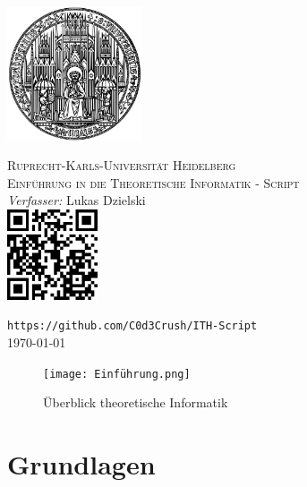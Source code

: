 \documentclass[a4paper,11pt]{article}
\begin{document}
\begin{titlepage}
    \centering
    \vspace*{2cm}
  
    \includegraphics[width=0.3\textwidth]{unilogo.png}
    \vspace{1cm}
  
    \textsc{\LARGE Ruprecht-Karls-Universität Heidelberg}\\[0.5cm]
    \textsc{\Large Einführung in die Theoretische Informatik - Script}\\[1.5cm]
  
    \Large \emph{Verfasser:} Lukas Dzielski\\[2cm]
  
    \includegraphics[width=0.2\textwidth]{qrcode.png}

    \texttt{\large https://github.com/C0d3Crush/ITH-Script}\\[2cm]
  
    {\large \today}\\[2cm]
  
    \vfill
  
  \end{titlepage}
\begin{figure}
    \centering
    \texttt{[image: Einführung.png]}
    \caption{Überblick theoretische Informatik}
    \label{fig:example}
\end{figure}

\section{Grundlagen}
\end{document}
